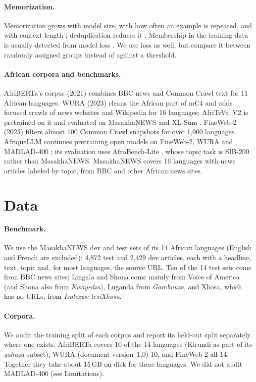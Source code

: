 \documentclass[11pt]{article}
\newcommand{\om}[1]{\textit{#1}}
\begin{document}
\paragraph{Memorization.} Memorization grows with model size, with how often an example is repeated, and with context length \citep{carlini2023quantifying}; deduplication reduces it \citep{kandpal2022dedup}. Membership in the training data is usually detected from model loss \citep{shi2024mink}. We use loss as well, but compare it between randomly assigned groups instead of against a threshold.

\paragraph{African corpora and benchmarks.} AfriBERTa's corpus (2021) combines BBC news and Common Crawl text for 11 African languages. WURA (2023) cleans the African part of mC4 and adds focused crawls of news websites and Wikipedia for 16 languages; AfriTeVa~V2 is pretrained on it and evaluated on MasakhaNEWS and XL-Sum \citep{hasan2021xlsum}. FineWeb-2 (2025) filters almost 100 Common Crawl snapshots for over 1,000 languages. AfriqueLLM continues pretraining open models on FineWeb-2, WURA and MADLAD-400 \citep{kudugunta2023madlad}; its evaluation uses AfroBench-Lite \citep{ojo2025afrobench}, whose topic task is SIB-200 rather than MasakhaNEWS. MasakhaNEWS covers 16 languages with news articles labeled by topic, from BBC and other African news sites.

\section{Data}
\label{sec:data}

\paragraph{Benchmark.} We use the MasakhaNEWS dev and test sets of its 14 African languages (English and French are excluded): 4,872 test and 2,429 dev articles, each with a headline, text, topic and, for most languages, the source URL. Ten of the 14 test sets come from BBC news sites; Lingala and Shona come mainly from Voice of America (and Shona also from \om{Kwayedza}), Luganda from \om{Gambuuze}, and Xhosa, which has no URLs, from \om{Isolezwe lesiXhosa}.

\paragraph{Corpora.} We audit the training split of each corpus and report its held-out split separately where one exists. AfriBERTa covers 10 of the 14 languages (Kirundi as part of its \om{gahuza} subset), WURA (document version~1.0) 10, and FineWeb-2 all 14. Together they take about 15\,GB on disk for these languages. We did not audit MADLAD-400 (see Limitations).
\end{document}
